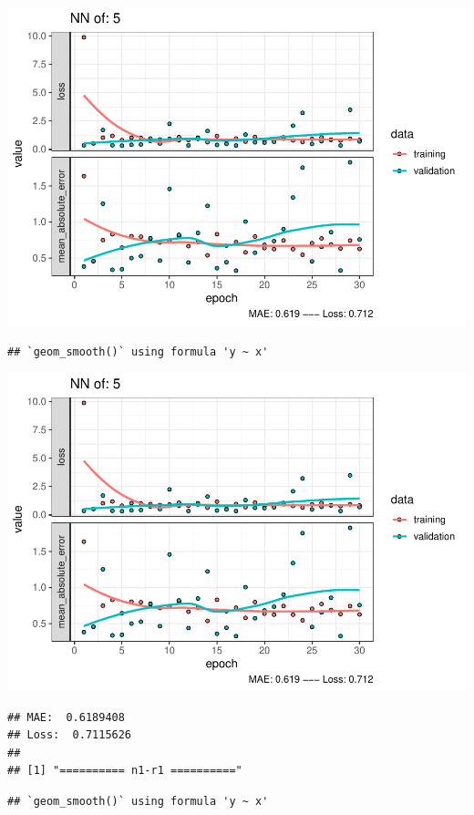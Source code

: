\documentclass[
]{article}
\begin{document}
\includegraphics{project-code_files/figure-latex/unnamed-chunk-18-9.pdf}

\begin{verbatim}
## `geom_smooth()` using formula 'y ~ x'
\end{verbatim}

\includegraphics{project-code_files/figure-latex/unnamed-chunk-18-10.pdf}

\begin{verbatim}
## MAE:  0.6189408
## Loss:  0.7115626 
## 
## [1] "========== n1-r1 =========="
\end{verbatim}

\begin{verbatim}
## `geom_smooth()` using formula 'y ~ x'
\end{verbatim}
\end{document}
